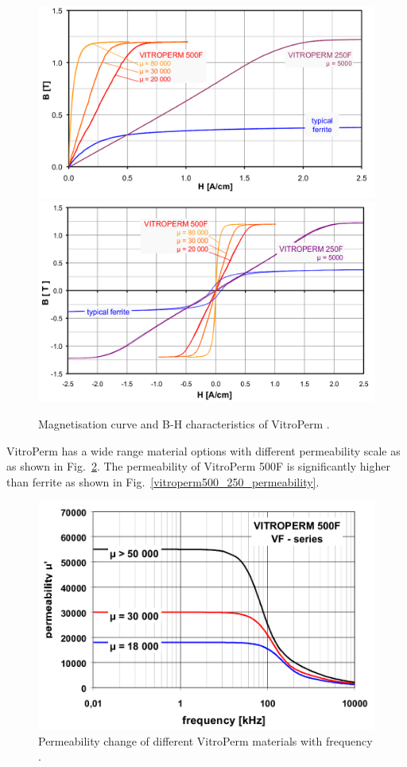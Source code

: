 \documentclass[a4paper, 11pt]{article} %
\begin{document}
\begin{figure}[]
  \centering
    \includegraphics[scale=0.3]{vitroperm_magnetization}
    \includegraphics[scale=0.3]{vitroterm_hysteresis}
    \caption{Magnetisation curve and B-H characteristics of VitroPerm \cite{vitroterm_manual}.}
  \label{vitroterm_BH}
\end{figure}

VitroPerm has a wide range material options with different permeability scale as as shown in Fig.~\ref{vitroterm_permeability}. 
The permeability of VitroPerm 500F is significantly higher than ferrite as shown in Fig.~\ref{vitroperm500_250_permeability}.

\begin{figure}[]
  \centering
    \includegraphics[scale=0.3]{vitroterm_permeability}
  \caption{Permeability change of different VitroPerm materials with frequency \cite{vitroterm_toroidal}.}
  \label{vitroterm_permeability}
\end{figure}
\end{document}
